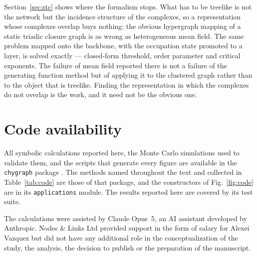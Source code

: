 \documentclass[aps,pre,twocolumn,superscriptaddress,floatfix,longbibliography]{revtex4-2}
\newcommand{\code}[1]{\texttt{#1}}
\begin{document}
Section~\ref{sec:stc} shows where the formalism stops. What has to be treelike
is not the network but the incidence structure of the complexes, so a
representation whose complexes overlap buys nothing: the obvious hypergraph
mapping of a static triadic closure graph is as wrong as heterogeneous mean
field. The same problem mapped onto the backbone, with the occupation state
promoted to a layer, is solved exactly --- closed-form threshold, order parameter
and critical exponents. The failure of mean field reported there
\cite{cirigliano2025} is not a failure of the generating function method but of
applying it to the clustered graph rather than to the object that is treelike.
Finding the representation in which the complexes do not overlap is the work,
and it need not be the obvious one.

\section*{Code availability}

All symbolic calculations reported here, the Monte Carlo simulations used to
validate them, and the scripts that generate every figure are available in the
\code{chygraph} package \cite{chygraphcode}. The methods named throughout the
text and collected in Table~\ref{tab:code} are those of that package, and the
constructors of Fig.~\ref{fig:code} are in its \code{applications} module. The
results reported here are covered by its test suite.

\begin{acknowledgments}
The calculations were assisted by Claude Opus~5, an AI assistant developed by
Anthropic. Nodes \& Links Ltd provided support in the form of salary for Alexei
Vazquez but did not have any additional role in the conceptualization of the
study, the analysis, the decision to publish or the preparation of the
manuscript.
\end{acknowledgments}
\end{document}
